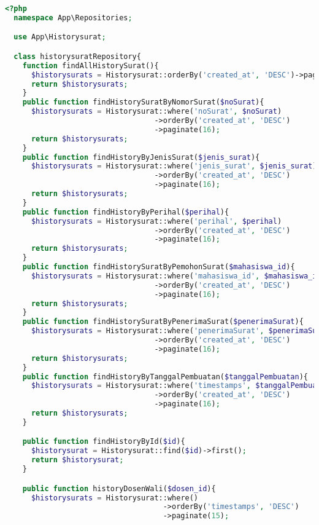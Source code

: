 \begin{lstlisting}[language=php, caption=HistorysuratRepository.php]
	<?php
  namespace App\Repositories;

  use App\Historysurat;

  class historysuratRepository{
    function findAllHistorySurat(){
      $historysurats = Historysurat::orderBy('created_at', 'DESC')->paginate(15);
      return $historysurats;
    }
    public function findHistorySuratByNomorSurat($noSurat){
      $historysurats = Historysurat::where('noSurat', $noSurat)
                                  ->orderBy('created_at', 'DESC')
                                  ->paginate(16);
      return $historysurats;
    }
    public function findHistoryByJenisSurat($jenis_surat){
      $historysurats = Historysurat::where('jenis_surat', $jenis_surat)
                                  ->orderBy('created_at', 'DESC')
                                  ->paginate(16);
      return $historysurats;
    }
    public function findHistoryByPerihal($perihal){
      $historysurats = Historysurat::where('perihal', $perihal)
                                  ->orderBy('created_at', 'DESC')
                                  ->paginate(16);
      return $historysurats;
    }
    public function findHistorySuratByPemohonSurat($mahasiswa_id){
      $historysurats = Historysurat::where('mahasiswa_id', $mahasiswa_id)
                                  ->orderBy('created_at', 'DESC')
                                  ->paginate(16);
      return $historysurats;
    }
    public function findHistorySuratByPenerimaSurat($penerimaSurat){
      $historysurats = Historysurat::where('penerimaSurat', $penerimaSurat)
                                  ->orderBy('created_at', 'DESC')
                                  ->paginate(16);
      return $historysurats;
    }
    public function findHistoryByTanggalPembuatan($tanggalPembuatan){
      $historysurats = Historysurat::where('timestamps', $tanggalPembuatan)
                                  ->orderBy('created_at', 'DESC')
                                  ->paginate(16);
      return $historysurats;
    }

    public function findHistoryById($id){
      $historysurat = Historysurat::find($id)->first();
      return $historysurat;
    }

    public function historyDosenWali($dosen_id){
      $historysurats = Historysurat::where()
                                    ->orderBy('timestamps', 'DESC')
                                    ->paginate(15);


\end{lstlisting}
